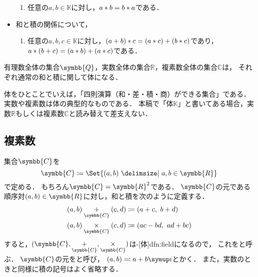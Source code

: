 \documentclass[../sotsu.tex]{subfiles}
\begin{document}
\begin{definition}[体]
\begin{itemize}
\begin{enumerate}[resume]
            \item \label{field:prod-commutative} 任意の$a, b \in 𝕂$に対し，$a \mathbin{\ast} b = b \mathbin{\ast} a$である．
        \end{enumerate}
        \item 和と積の関係について，
        \begin{enumerate}[resume]
            \item \label{field:distributive} 任意の$a, b, c \in 𝕂$に対し，$(a + b) \mathbin{\ast} c = (a \mathbin{\ast} c) + (b \mathbin{\ast} c)$であり，$a \mathbin{\ast} (b + c) = (a \mathbin{\ast} b) + (a \mathbin{\ast} c)$である．
        \end{enumerate}    
    \end{itemize}
\end{definition}

\begin{example}
    有理数全体の集合$\symbb{Q}$，実数全体の集合$ℝ$，複素数全体の集合$ℂ$は，
    それぞれ通常の和と積に関して体になる．
\end{example}

体をひとことでいえば，「四則演算（和・差・積・商）ができる集合」である．
実数や複素数は体の典型的なものである．
本稿で「体$𝕂$」と書いてある場合，実数$ℝ$もしくは複素数$ℂ$と読み替えて差支えない．



\subsection{複素数}

集合$\symbb{C}$を
\begin{equation}
    \symbb{C} \coloneq \Set{  (a, b)  \given  a, b \in \symbb{R}  }
\end{equation}
で定める．
もちろん$\symbb{C} = \symbb{R}^2$である．
$\symbb{C}$の元である順序対$(a, b) \in \symbb{R}$に対し，和と積を次のように定義する．
\begin{align}
    (a, b) \underset{\symbb{C}}{+} (c, d) &\coloneq (a+c, \  b+d)  \\
    (a, b) \underset{\symbb{C}}{\times} (c, d) &\coloneq (ac-bd, \  ad+bc)
\end{align}
すると，$(\symbb{C}, \underset{\symbb{C}}{+}, \underset{\symbb{C}}{\times})$は-[体]{dfn:field}になるので，
これをと呼ぶ．
$\symbb{C}$の元をと呼び，
$(a, b) \eqcolon a + b\iu$とかく．
また，実数のときと同様に積の記号はよく省略する．
\end{document}
